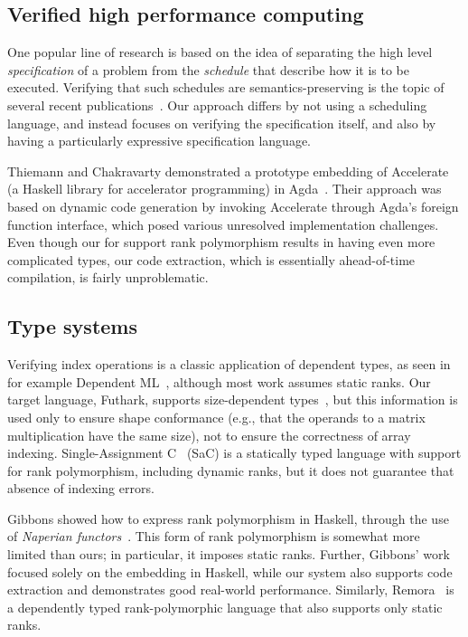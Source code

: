 \subsection{Verified high performance computing}

One popular line of research is based on the idea of separating the
high level \emph{specification} of a problem from the \emph{schedule}
that describe how it is to be executed. Verifying that such schedules
are semantics-preserving is the topic of several recent
publications~\cite{10.1145/3527328,10.1145/3498717}. Our approach
differs by not using a scheduling language, and instead focuses on
verifying the specification itself, and also by having a particularly
expressive specification language.

Thiemann and Chakravarty demonstrated a prototype embedding of
Accelerate~\cite{10.1145/1926354.1926358} (a Haskell library for
accelerator programming) in Agda~\cite{thiemann2013agda}. Their
approach was based on dynamic code generation by invoking Accelerate
through Agda's foreign function interface, which posed various
unresolved implementation challenges. Even though our for support rank
polymorphism results in having even more complicated types, our code
extraction, which is essentially ahead-of-time compilation, is fairly
unproblematic.

\subsection{Type systems}

Verifying index operations is a classic application of dependent
types, as seen in for example Dependent
ML~\cite{10.1145/292540.292560}, although most work assumes static
ranks. Our target language, Futhark, supports size-dependent
types~\cite{10.1145/3609024.3609412}, but this information is used
only to ensure shape conformance (e.g., that the operands to a matrix
multiplication have the same size), not to ensure the correctness of
array indexing. Single-Assignment C~\cite{sac2} (SaC) is a statically
typed language with support for rank polymorphism, including dynamic
ranks, but it does not guarantee that absence of indexing errors.

Gibbons showed how to express rank polymorphism in Haskell, through
the use of \emph{Naperian functors}~\cite{10.1145/2976022.2976023}.
This form of rank polymorphism is somewhat more limited than ours; in
particular, it imposes static ranks. Further, Gibbons' work focused
solely on the embedding in Haskell, while our system also supports
code extraction and demonstrates good real-world performance.
Similarly, Remora~\cite{rank-poly} is a dependently typed
rank-polymorphic language that also supports only static ranks.
